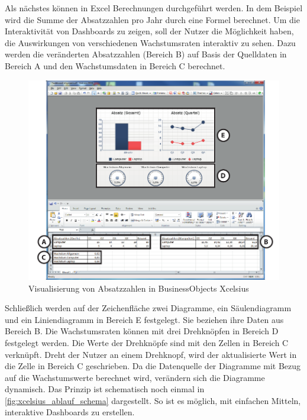 \begin{onehalfspacing}
Als nächstes können in Excel Berechnungen durchgeführt werden. In dem Beispiel wird die Summe der Absatzzahlen pro Jahr durch eine Formel berechnet. Um die Interaktivität von Dashboards zu zeigen, soll der Nutzer die Möglichkeit haben, die Auswirkungen von verschiedenen Wachstumsraten interaktiv zu sehen. Dazu werden die veränderten Absatzzahlen (Bereich B) auf Basis der Quelldaten in Bereich A und den Wachstumsdaten in Bereich C berechnet.

\begin{figure}[ht]
\centering
\setlength{\unitlength}{1mm}
\includegraphics[width=15cm]{images/Abbildung6-Visualisierung-Absatz-Xcelsius-AI.pdf}
\caption{Visualisierung von Absatzzahlen in BusinessObjects Xcelsius\label{fig:xcelsius_ui_beispiel}}
\end{figure} 

Schließlich werden auf der Zeichenfläche zwei Diagramme, ein Säulendiagramm und ein Liniendiagramm in Bereich E festgelegt. Sie beziehen ihre Daten aus Bereich B. Die Wachstumsraten können mit drei Drehknöpfen in Bereich D festgelegt werden. Die Werte der Drehknöpfe sind mit den Zellen in Bereich C verknüpft. Dreht der Nutzer an einem Drehknopf, wird der aktualisierte Wert in die Zelle in Bereich C geschrieben. Da die Datenquelle der Diagramme mit Bezug auf die Wachstumswerte berechnet wird, verändern sich die Diagramme dynamisch. Das Prinzip ist schematisch noch einmal in \vref{fig:xcelsius_ablauf_schema} dargestellt. So ist es möglich, mit einfachen Mitteln, interaktive Dashboards zu erstellen.


\end{onehalfspacing}

